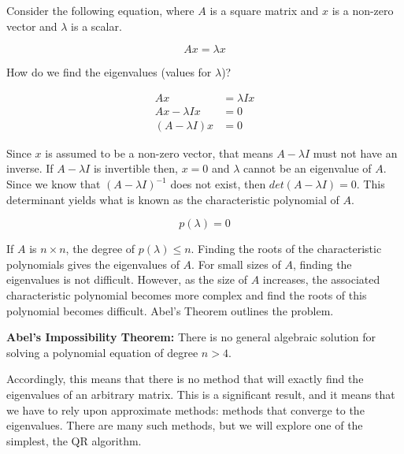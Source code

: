 \label{Ch:EigSolve}


Consider the following equation, where $A$ is a square matrix and $x$ is a non-zero vector and $\lambda$ is a scalar.

\begin{equation}
\label{eqn:eigval}
A x = \lambda x
\end{equation}

How do we find the eigenvalues (values for $\lambda$)?

\begin{equation*}
\begin{split}
 A x &= \lambda I x \\
A x - \lambda I x &= 0 \\
(A - \lambda I)x &= 0
\end{split}
\end{equation*}

Since $x$ is assumed to be a non-zero vector, that means $A-\lambda I$ must not have an inverse.  If $A-\lambda I$ is invertible then, $x=0$ and $\lambda$ cannot be an eigenvalue of $A$.  Since we know that $(A - \lambda I)^{-1}$ does not exist, then $det(A-\lambda I) = 0$.  This determinant yields what is known as the characteristic polynomial of $A$.

\begin{equation*}
 p(\lambda) = 0
\end{equation*}

If $A$ is $n \times n$, the degree of $p(\lambda) \leq n$.  Finding the roots of the characteristic polynomials gives the eigenvalues of $A$.  For small sizes of $A$, finding the eigenvalues is not difficult.  However, as the size of $A$ increases, the associated characteristic polynomial becomes more complex and find the roots of this polynomial becomes difficult.  Abel's Theorem  outlines the problem.

\begin{theorem}
{\bf Abel's Impossibility Theorem:} There is no general algebraic solution for solving a polynomial equation of degree $n>4$.
\end{theorem}

Accordingly, this means that there is no method that will exactly find the eigenvalues of an arbitrary matrix. This is a significant result, and it means that we have to rely upon approximate methods: methods that converge to the eigenvalues. There are many such methods, but we will explore one of the simplest, the QR algorithm.

